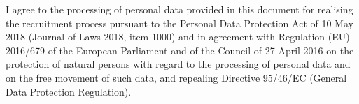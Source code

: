 \begin{sectionlist}
\end{sectionlist}

\vspace*{\fill}
\small
I agree to the processing of personal data provided in this document for
realising the recruitment process pursuant to the Personal Data Protection
Act of 10 May 2018 (Journal of Laws 2018, item 1000) and in agreement with
Regulation (EU) 2016/679 of the European Parliament and of the Council of 27
April 2016 on the protection of natural persons with regard to the
processing of personal data and on the free movement of such data, and
repealing Directive 95/46/EC (General Data Protection Regulation).
